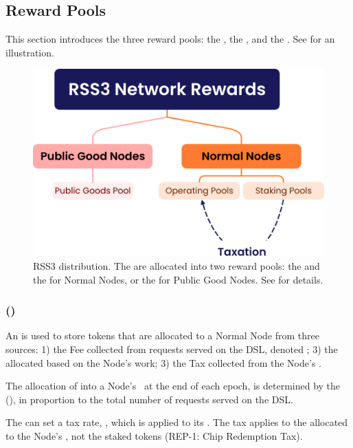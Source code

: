\subsection{Reward Pools}
\label{subsec:reward_pools}

This section introduces the three reward pools: the , the , and the . See  for an illustration.

{
\begin{figure}[tb!]
    \centering
    \includegraphics[width=0.9\columnwidth]{figures/network-rewards.png}
    \caption{RSS3  distribution.
    The  are allocated into two reward pools: the  and the  for Normal Nodes, or the  for Public Good Nodes.
    See  for details.}
    \label{fig:network-rewards}
\end{figure}
}

\subsubsection{ (\operationPool)}
\label{subsubsec:operation_pool}

An  is used to store tokens that are allocated to a Normal Node from three sources: 1) the \gls{Fee} collected from requests served on the \gls{DSL}, denoted \work; 3) the  allocated based on the Node’s work; 3) the \gls{Tax} collected from the Node's \stakingPool.

The allocation of  into a Node's \operationPool\ at the end of each epoch, is determined by the  (\work), in proportion to the total number of requests served on the \gls{DSL}.

The  can set a tax rate, \tax, which is applied to its \stakingPool.
The tax applies to the  allocated to the Node's \stakingPool, not the staked tokens (REP-1: Chip Redemption Tax).

